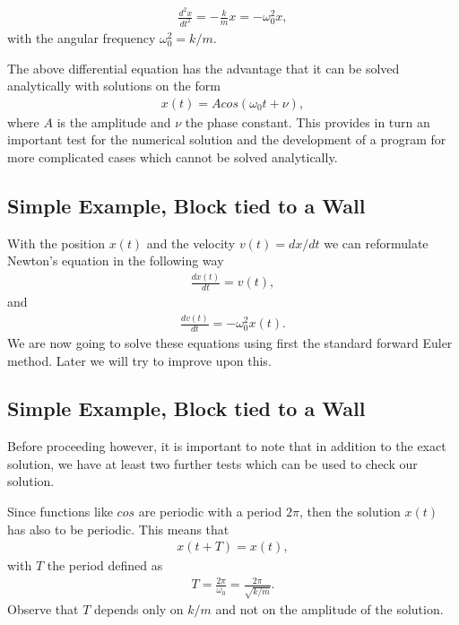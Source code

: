\documentclass[letterpaper,10pt,english]{sphinxmanual}
\begin{document}
\begin{equation*}
\begin{split}
\frac{d^2x}{dt^2}=-\frac{k}{m}x=-\omega_0^2x,
\label{eq:newton1} \tag{19}
\end{split}
\end{equation*}
with the angular frequency \(\omega_0^2=k/m\).

The above differential equation has the advantage that it can be solved  analytically with solutions on the form
\begin{equation*}
\begin{split}
x(t)=Acos(\omega_0t+\nu),
\end{split}
\end{equation*}
where \(A\) is the amplitude and \(\nu\) the phase constant.   This provides in turn an important test for the numerical
solution and the development of a program for more complicated cases which cannot be solved analytically.


\subsection{Simple Example, Block tied to a Wall}
\label{\detokenize{chapter2:simple-example-block-tied-to-a-wall}}
With the position \(x(t)\) and the velocity  \(v(t)=dx/dt\) we can reformulate Newton’s equation in the following way
\begin{equation*}
\begin{split}
\frac{dx(t)}{dt}=v(t),
\end{split}
\end{equation*}
and
\begin{equation*}
\begin{split}
\frac{dv(t)}{dt}=-\omega_0^2x(t).
\end{split}
\end{equation*}
We are now going to solve these equations using first the standard forward Euler  method. Later we will try to improve upon this.


\subsection{Simple Example, Block tied to a Wall}
\label{\detokenize{chapter2:id1}}
Before proceeding however, it is important to note that in addition to the exact solution, we have at least two further tests which can be used to check our solution.

Since functions like \(cos\) are periodic with a period \(2\pi\), then the solution \(x(t)\) has also to be periodic. This means that
\begin{equation*}
\begin{split}
x(t+T)=x(t),
\end{split}
\end{equation*}
with \(T\) the period defined as
\begin{equation*}
\begin{split}
T=\frac{2\pi}{\omega_0}=\frac{2\pi}{\sqrt{k/m}}.
\end{split}
\end{equation*}
Observe that \(T\) depends only on \(k/m\) and not on the amplitude of the solution.
\end{document}
